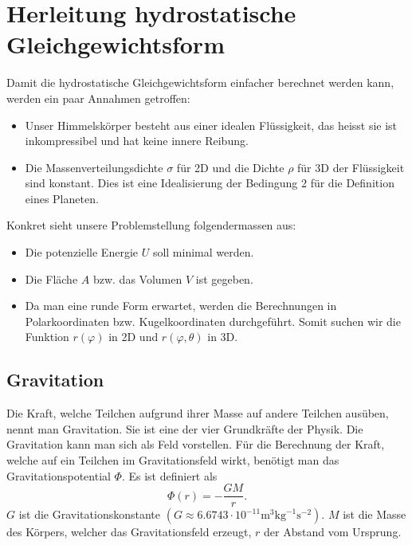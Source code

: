 %
%
%
%
\section{Herleitung hydrostatische Gleichgewichtsform
\label{planet:section:teil1}}
Damit die hydrostatische Gleichgewichtsform einfacher berechnet werden kann, werden ein paar Annahmen getroffen:
\begin{itemize}
	\item Unser Himmelskörper besteht aus einer idealen Flüssigkeit, das heisst sie ist inkompressibel und hat keine innere Reibung.
	\item Die Massenverteilungsdichte \(\sigma\) für 2D und die Dichte \(\rho\) für 3D der Flüssigkeit sind konstant.
	Dies ist eine Idealisierung der Bedingung 2 für die Definition eines Planeten.
\end{itemize}

\noindent
Konkret sieht unsere Problemstellung folgendermassen aus:
\begin{itemize}
	\item Die potenzielle Energie \(U\) soll minimal werden.
	\item Die Fläche \(A\) bzw. das Volumen \(V\) ist gegeben.
	\item Da man eine runde Form erwartet, werden die Berechnungen in Polarkoordinaten bzw. Kugelkoordinaten durchgeführt. Somit suchen wir die Funktion \(r(\varphi)\) in 2D und \(r(\varphi,\theta)\) in 3D.
\end{itemize}

\subsection{Gravitation}

Die Kraft, welche Teilchen aufgrund ihrer Masse auf andere Teilchen ausüben, nennt man Gravitation.
Sie ist eine der vier Grundkräfte der Physik.
Die Gravitation kann man sich als Feld vorstellen.
Für die Berechnung der Kraft, welche auf ein Teilchen im Gravitationsfeld wirkt, benötigt man das Gravitationspotential \(\Phi\).
Es ist definiert als
\begin{equation}
	\Phi(r) = -\frac{GM}{r}.
	\label{planet:equ:gravpot}
\end{equation}
\(G\) ist die Gravitationskonstante \((G \approx 6.6743 \cdot 10^{-11} \text{m}^3 \text{kg}^{-1} \text{s}^{-2})\).
\(M\) ist die Masse des Körpers, welcher das Gravitationsfeld erzeugt, \(r\) der Abstand vom Ursprung.

